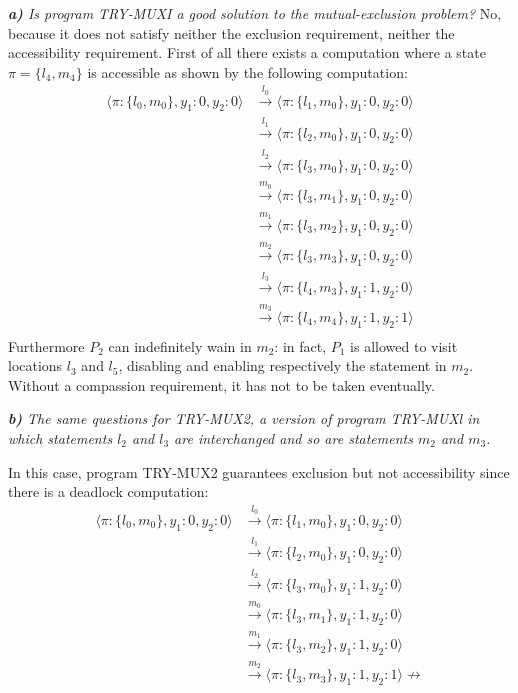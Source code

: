 \documentclass[12pt]{article}
\begin{document}
\textit{\textbf{a)} Is program TRY-MUXI a good solution to the mutual-exclusion problem?}
No, because it does not satisfy neither the exclusion requirement, neither the accessibility requirement. First of all there exists a computation where a state $\pi = \{l_4,m_4\}$ is accessible as shown by the following computation:
\begin{align*}
\langle \pi:\{l_0,m_0\},y_1:0,y_2:0 \rangle & \xrightarrow{l_0} \langle \pi:\{l_1,m_0\},y_1:0,y_2:0 \rangle\\
& \xrightarrow{l_1} \langle \pi:\{l_2,m_0\},y_1:0,y_2:0 \rangle\\
& \xrightarrow{l_2} \langle \pi:\{l_3,m_0\},y_1:0,y_2:0 \rangle\\
& \xrightarrow{m_0} \langle \pi:\{l_3,m_1\},y_1:0,y_2:0 \rangle\\
& \xrightarrow{m_1} \langle \pi:\{l_3,m_2\},y_1:0,y_2:0 \rangle\\
& \xrightarrow{m_2} \langle \pi:\{l_3,m_3\},y_1:0,y_2:0 \rangle\\
& \xrightarrow{l_3} \langle \pi:\{l_4,m_3\},y_1:1,y_2:0 \rangle\\
& \xrightarrow{m_3} \langle \pi:\{l_4,m_4\},y_1:1,y_2:1 \rangle\\
\end{align*}
Furthermore $P_2$ can indefinitely wain in $m_2$: in fact, $P_1$ is allowed to visit locations $l_3$ and $l_5$, disabling and enabling respectively the statement in $m_2$. Without a compassion requirement, it has not to be taken eventually.

\medskip
\textit{\textbf{b)} The same questions for TRY-MUX2, a version of program TRY-MUXl in which statements $l_2$ and $l_3$ are interchanged and so are statements $m_2$ and $m_3$.}

In this case, program TRY-MUX2 guarantees exclusion but not accessibility since there is a deadlock computation:
\begin{align*}
\langle \pi:\{l_0,m_0\},y_1:0,y_2:0 \rangle & \xrightarrow{l_0} \langle \pi:\{l_1,m_0\},y_1:0,y_2:0 \rangle\\
& \xrightarrow{l_1} \langle \pi:\{l_2,m_0\},y_1:0,y_2:0 \rangle\\
& \xrightarrow{l_2} \langle \pi:\{l_3,m_0\},y_1:1,y_2:0 \rangle\\
& \xrightarrow{m_0} \langle \pi:\{l_3,m_1\},y_1:1,y_2:0 \rangle\\
& \xrightarrow{m_1} \langle \pi:\{l_3,m_2\},y_1:1,y_2:0 \rangle\\
& \xrightarrow{m_2} \langle \pi:\{l_3,m_3\},y_1:1,y_2:1 \rangle \not\rightarrow\\
\end{align*}
\end{document}
